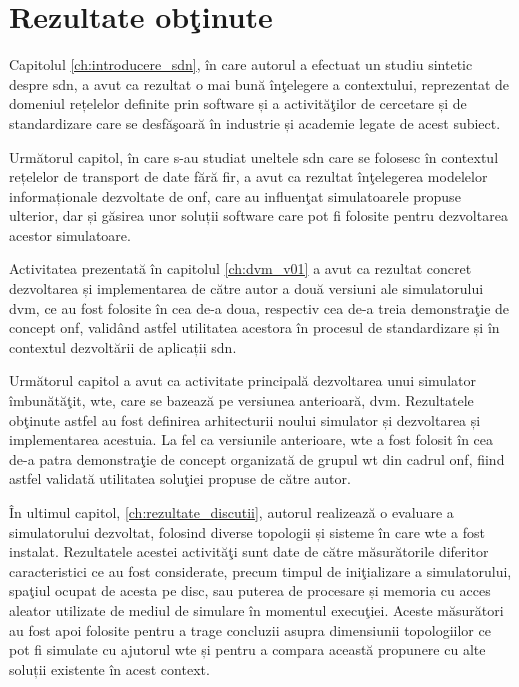 \section{Rezultate obţinute}

Capitolul \ref{ch:introducere_sdn}, în care autorul a efectuat un studiu sintetic despre \gls{sdn}, a avut ca rezultat o mai bună înţelegere a contextului, reprezentat de domeniul rețelelor definite prin software și a activităţilor de cercetare și de standardizare care se desfăşoară în industrie și academie legate de acest subiect. 

Următorul capitol, în care s-au studiat uneltele \gls{sdn} care se folosesc în contextul rețelelor de transport de date fără fir, a avut ca rezultat înţelegerea modelelor informaționale dezvoltate de \gls{onf}, care au influenţat simulatoarele propuse ulterior, dar și găsirea unor soluții software care pot fi folosite pentru dezvoltarea acestor simulatoare.

Activitatea prezentată în capitolul \ref{ch:dvm_v01} a avut ca rezultat concret dezvoltarea și implementarea de către autor a două versiuni ale simulatorului \gls{dvm}, ce au fost folosite în cea de-a doua, respectiv cea de-a treia demonstraţie de concept \gls{onf}, validând astfel utilitatea acestora în procesul de standardizare și în contextul dezvoltării de aplicații \gls{sdn}.

Următorul capitol a avut ca activitate principală dezvoltarea unui simulator îmbunătăţit, \gls{wte}, care se bazează pe versiunea anterioară, \gls{dvm}. Rezultatele obţinute astfel au fost definirea arhitecturii noului simulator și dezvoltarea și implementarea acestuia. La fel ca versiunile anterioare, \gls{wte} a fost folosit în cea de-a patra demonstraţie de concept organizată de grupul \gls{wt} din cadrul \gls{onf}, fiind astfel validată utilitatea soluţiei propuse de către autor.

În ultimul capitol, \ref{ch:rezultate_discutii}, autorul realizează o evaluare a simulatorului dezvoltat, folosind diverse topologii și sisteme în care \gls{wte} a fost instalat. Rezultatele acestei activităţi sunt date de către măsurătorile diferitor caracteristici ce au fost considerate, precum timpul de iniţializare a simulatorului, spaţiul ocupat de acesta pe disc, sau puterea de procesare și memoria cu acces aleator utilizate de mediul de simulare în momentul execuţiei. Aceste măsurători au fost apoi folosite pentru a trage concluzii asupra dimensiunii topologiilor ce pot fi simulate cu ajutorul \gls{wte} și pentru a compara această propunere cu alte soluții existente în acest context.